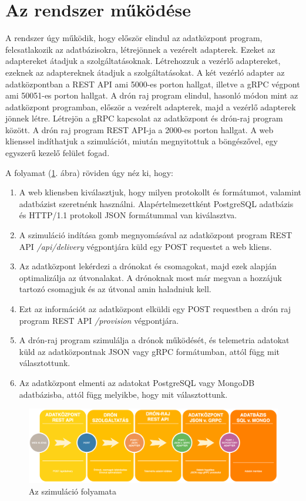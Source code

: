 \section{Az rendszer működése}

A rendszer úgy működik, hogy először elindul az adatközpont program, felcsatlakozik az adatbázisokra, létrejönnek a vezérelt adapterek.
Ezeket az adaptereket átadjuk a szolgáltatásoknak. Létrehozzuk a vezérlő adaptereket, ezeknek az adaptereknek átadjuk a szolgáltatásokat.
A két vezérló adapter az adatközpontban a REST API ami 5000-es porton hallgat, illetve a gRPC végpont ami 50051-es porton hallgat.
A drón raj program elindul, hasonló módon mint az adatközpont programban, először a vezérelt adapterek, majd a vezérlő adapterek jönnek létre.
Létrejön a gRPC kapcsolat az adatközpont és drón-raj program között.
A drón raj program REST API-ja a 2000-es porton hallgat.
A web klienssel indíthatjuk a szimulációt, miután megnyitottuk a böngészővel, egy egyszerű kezelő felület fogad.

A folyamat (\ref{fig:mukodes}. ábra) röviden úgy néz ki, hogy:
\begin{enumerate}
    \item A web kliensben kiválasztjuk, hogy milyen protokollt és formátumot, valamint adatbázist szeretnénk használni. Alapértelmezettként PostgreSQL adatbázis és HTTP/1.1 protokoll JSON formátummal van kiválasztva.
    \item A szimuláció indítása gomb megnyomásával az adatközpont program REST API \textit{/api/delivery} végpontjára küld egy POST requestet a web kliens.
    \item Az adatközpont lekérdezi a drónokat és csomagokat, majd ezek alapján optimalizálja az útvonalakat.
        A drónoknak most már megvan a hozzájuk tartozó csomagjuk és az útvonal amin haladniuk kell.
    \item Ezt az információt az adatközpont elküldi egy POST requestben a drón raj program REST API \textit{/provision} végpontjára.
    \item A drón-raj program szimulálja a drónok működését, és telemetria adatokat küld az adatközpontnak JSON vagy gRPC formátumban, attól függ mit választottunk.
    \item Az adatközpont elmenti az adatokat PostgreSQL vagy MongoDB adatbázisba, attól függ melyikbe, hogy mit választottunk.
\end{enumerate}

\begin{figure}[h]
    \centering
    \includegraphics[scale=0.3]{images/mukodes}
    \caption{Az szimuláció folyamata}
    \label{fig:mukodes}
\end{figure}



